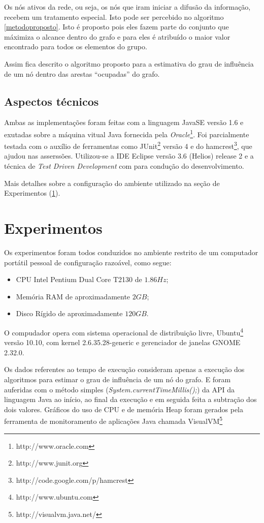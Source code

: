\documentclass{acm_proc_article-sp}
\begin{document}
Os nós ativos da rede, ou seja, os nós que iram iniciar a difusão da informação, recebem um tratamento especial.
Isto pode ser percebido no algoritmo \ref{metodoproposto}. Isto é proposto pois eles fazem parte do conjunto que
máximiza o alcance dentro do grafo e para eles é atribuído o maior valor encontrado para todos os elementos do grupo.

Assim fica descrito o algoritmo proposto para a estimativa do grau de influência de um nó dentro das arestas
``ocupadas'' do grafo.

\subsection{Aspectos técnicos}
Ambas as implementações foram feitas com a linguagem JavaSE versão 1.6 e exutadas sobre a máquina vitual Java
fornecida pela \textit{Oracle}\footnote{http://www.oracle.com}. Foi parcialmente testada com o auxílio de ferramentas como
JUnit\footnote{http://www.junit.org} versão 4 e do hamcrest\footnote{http://code.google.com/p/hamcrest}, que ajudou
nas asserssões. Utilizou-se a IDE Eclipse versão 3.6 (Helios) release 2 e a técnica de \textit{Test Driven
Development} com para condução do desenvolvimento.

Mais detalhes sobre a configuração do ambiente utilizado na seção de Experimentos (\ref{experimentos}).

\section{Experimentos}\label{experimentos}
Os experimentos foram todos conduzidos no ambiente restrito de um computador portátil pessoal de configuração
razoável, como segue:

\begin{itemize}
  \item CPU Intel Pentium Dual Core T2130 de $1.86 Hz$;
  \item Memória RAM de aproximadamente $2 GB$; 
  \item Disco Rígido de aproximadamente $120 GB$.
\end{itemize}

O compudador opera com sistema operacional de distribuição livre, Ubuntu\footnote{http://www.ubuntu.com} versão
10.10, com kernel 2.6.35.28-generic e gerenciador de janelas GNOME 2.32.0. 

Os dados referentes ao tempo de execução consideram apenas a execução dos algoritmos para estimar o grau de
influência de um nó do grafo. E foram auferidas com o método simples (\textit{System.currentTimeMillis();})
da API da linguagem Java ao início, ao final da execução e em seguida feita a subtração dos dois valores. Gráficos
do uso de CPU e de memória Heap foram gerados pela ferramenta de monitoramento de aplicações Java chamada
VisualVM\footnote{http://visualvm.java.net/}
\end{document}
